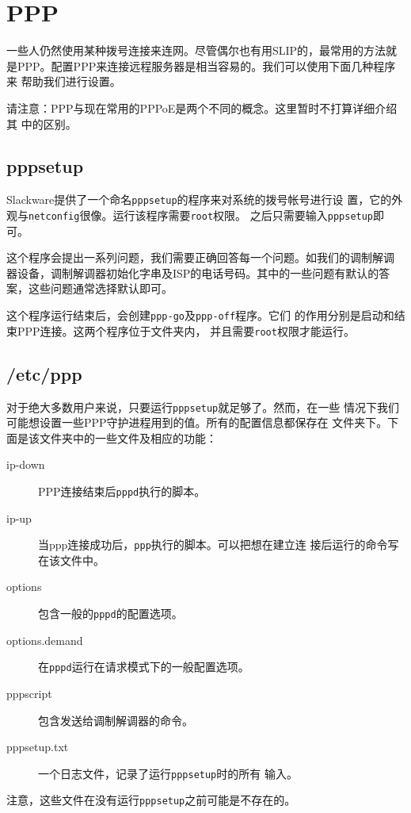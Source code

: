 \section{PPP}
\label{sec:networkConfiguration:ppp}
一些人仍然使用某种拨号连接来连网。尽管偶尔也有用SLIP的，最常用的方法就
是PPP。配置PPP来连接远程服务器是相当容易的。我们可以使用下面几种程序来
帮助我们进行设置。

请注意：PPP与现在常用的PPPoE是两个不同的概念。这里暂时不打算详细介绍其
中的区别。%

\subsection{pppsetup}
\label{sec:networkConfiguration:ppp:pppsetup}
Slackware提供了一个命名\texttt{pppsetup}的程序来对系统的拨号帐号进行设
置，它的外观与\texttt{netconfig}很像。运行该程序需要\texttt{root}权限。
之后只需要输入\texttt{pppsetup}即可。

这个程序会提出一系列问题，我们需要正确回答每一个问题。如我们的调制解调
器设备，调制解调器初始化字串及ISP的电话号码。其中的一些问题有默认的答
案，这些问题通常选择默认即可。

这个程序运行结束后，会创建\texttt{ppp-go}及\texttt{ppp-off}程序。它们
的作用分别是启动和结束PPP连接。这两个程序位于文件夹内，
并且需要\texttt{root}权限才能运行。

\subsection{/etc/ppp}
\label{sec:networkConfiguration:ppp:ppp}
对于绝大多数用户来说，只要运行\texttt{pppsetup}就足够了。然而，在一些
情况下我们可能想设置一些PPP守护进程用到的值。所有的配置信息都保存在
文件夹下。下面是该文件夹中的一些文件及相应的功能：

\begin{description}
\item[ip-down] PPP连接结束后\texttt{pppd}执行的脚本。
\item[ip-up] 当ppp连接成功后，\texttt{ppp}执行的脚本。可以把想在建立连
  接后运行的命令写在该文件中。
\item[options] 包含一般的\texttt{pppd}的配置选项。
\item[options.demand] 在\texttt{pppd}运行在请求模式下的一般配置选项。
\item[pppscript] 包含发送给调制解调器的命令。
\item[pppsetup.txt] 一个日志文件，记录了运行\texttt{pppsetup}时的所有
  输入。
\end{description}
注意，这些文件在没有运行\texttt{pppsetup}之前可能是不存在的。

